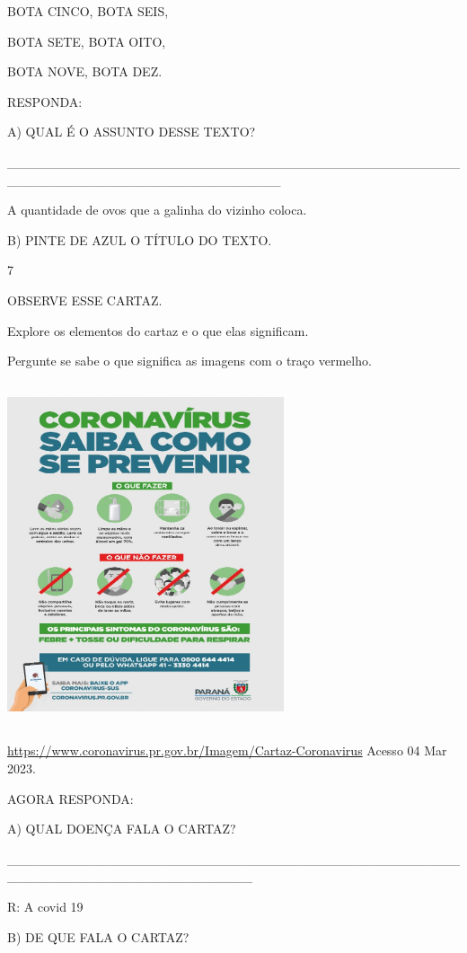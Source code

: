 {{BOTA CINCO, BOTA SEIS,

BOTA SETE, BOTA OITO,

BOTA NOVE, BOTA DEZ.

RESPONDA:

A) QUAL É O ASSUNTO DESSE TEXTO?

\_\_\_\_\_\_\_\_\_\_\_\_\_\_\_\_\_\_\_\_\_\_\_\_\_\_\_\_\_\_\_\_\_\_\_\_\_\_\_\_\_\_\_\_\_\_\_\_\_\_\_\_\_\_\_\_\_\_\_\_\_\_\_\_\_\_\_\_\_\_\_\_\_\_\_\_\_

A quantidade de ovos que a galinha do vizinho coloca.

B) PINTE DE AZUL O TÍTULO DO TEXTO.

\num{7}

OBSERVE ESSE CARTAZ.

Explore os elementos do cartaz e o que elas significam.

Pergunte se sabe o que significa as imagens com o traço vermelho.

\includegraphics[width=3.20896in,height=3.98057in]{media/image120.jpeg}

\url{https://www.coronavirus.pr.gov.br/Imagem/Cartaz-Coronavirus} Acesso
04 Mar 2023.

AGORA RESPONDA:

A) QUAL DOENÇA FALA O CARTAZ?

\_\_\_\_\_\_\_\_\_\_\_\_\_\_\_\_\_\_\_\_\_\_\_\_\_\_\_\_\_\_\_\_\_\_\_\_\_\_\_\_\_\_\_\_\_\_\_\_\_\_\_\_\_\_\_\_\_\_\_\_\_\_\_\_\_\_\_\_\_\_\_\_\_\_

R: A covid 19

B) DE QUE FALA O CARTAZ?

}}
